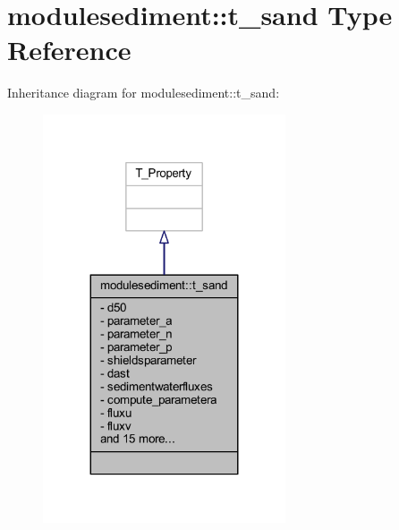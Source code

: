 \hypertarget{structmodulesediment_1_1t__sand}{}\section{modulesediment\+:\+:t\+\_\+sand Type Reference}
\label{structmodulesediment_1_1t__sand}


Inheritance diagram for modulesediment\+:\+:t\+\_\+sand\+:\nopagebreak
\begin{figure}[H]
\begin{center}
\leavevmode
\includegraphics[width=203pt]{structmodulesediment_1_1t__sand__inherit__graph}
\end{center}
\end{figure}


